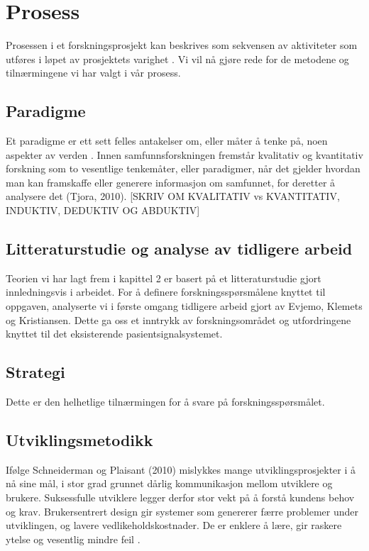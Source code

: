 \section{Prosess}
\label{chp: prosess}

Prosessen i et forskningsprosjekt kan beskrives som sekvensen av aktiviteter som utføres i løpet av prosjektets varighet \cite{Oates}. Vi vil nå gjøre rede for de metodene og tilnærmingene vi har valgt i vår prosess.

\subsection{Paradigme}
Et paradigme er ett sett felles antakelser om, eller måter å tenke på, noen aspekter av verden \cite{Oates}. Innen samfunnsforskningen fremstår kvalitativ og kvantitativ forskning som to vesentlige tenkemåter, eller paradigmer, når det gjelder hvordan man kan framskaffe eller generere informasjon om samfunnet, for deretter å analysere det (Tjora, 2010).
[SKRIV OM KVALITATIV vs KVANTITATIV, INDUKTIV, DEDUKTIV OG ABDUKTIV]


\subsection{Litteraturstudie og analyse av tidligere arbeid}
Teorien vi har lagt frem i kapittel 2 er basert på et litteraturstudie gjort innledningsvis i arbeidet. For å definere forskningsspørsmålene knyttet til oppgaven, analyserte vi i første omgang tidligere arbeid gjort av Evjemo, Klemets og Kristiansen. Dette ga oss et inntrykk av forskningsområdet og utfordringene knyttet til det eksisterende pasientsignalsystemet. 
	
\subsection{Strategi}
Dette er den helhetlige tilnærmingen for å svare på forskningsspørsmålet. 

\subsection{Utviklingsmetodikk}
Ifølge Schneiderman og Plaisant (2010) mislykkes mange utviklingsprosjekter i å nå sine mål, i stor grad grunnet dårlig kommunikasjon mellom utviklere og brukere. Suksessfulle utviklere legger derfor stor vekt på å forstå kundens behov og krav. 
Brukersentrert design gir systemer som genererer færre problemer under utviklingen, og lavere vedlikeholdskostnader. De er enklere å lære, gir raskere ytelse og vesentlig mindre feil \cite{mmi}. 
 
